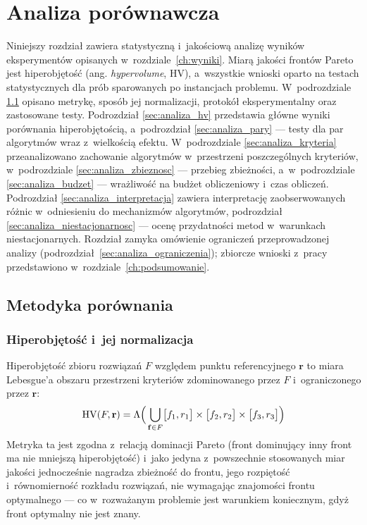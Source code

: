 \chapter{Analiza porównawcza}
\label{ch:analiza}

Niniejszy rozdział zawiera statystyczną i~jakościową analizę wyników eksperymentów
opisanych w~rozdziale~\ref{ch:wyniki}. Miarą jakości frontów Pareto jest
hiperobjętość (ang. \textit{hypervolume}, HV), a~wszystkie wnioski oparto na
testach statystycznych dla prób sparowanych po instancjach problemu.
W~podrozdziale \ref{sec:analiza_metodyka} opisano metrykę, sposób jej normalizacji,
protokół eksperymentalny oraz zastosowane testy. Podrozdział
\ref{sec:analiza_hv} przedstawia główne wyniki porównania hiperobjętością,
a~podrozdział \ref{sec:analiza_pary} --- testy dla par algorytmów wraz z~wielkością
efektu. W~podrozdziale \ref{sec:analiza_kryteria} przeanalizowano zachowanie
algorytmów w~przestrzeni poszczególnych kryteriów, w~podrozdziale
\ref{sec:analiza_zbieznosc} --- przebieg zbieżności, a~w~podrozdziale
\ref{sec:analiza_budzet} --- wrażliwość na budżet obliczeniowy i~czas obliczeń.
Podrozdział \ref{sec:analiza_interpretacja} zawiera interpretację zaobserwowanych
różnic w~odniesieniu do mechanizmów algorytmów, podrozdział
\ref{sec:analiza_niestacjonarnosc} --- ocenę przydatności metod w~warunkach
niestacjonarnych. Rozdział zamyka omówienie ograniczeń przeprowadzonej analizy
(podrozdział~\ref{sec:analiza_ograniczenia}); zbiorcze wnioski z~pracy
przedstawiono w~rozdziale~\ref{ch:podsumowanie}.

\section{Metodyka porównania}
\label{sec:analiza_metodyka}

\subsection{Hiperobjętość i~jej normalizacja}
\label{sec:analiza_hv_def}
Hiperobjętość zbioru rozwiązań $F$ względem punktu referencyjnego $\mathbf{r}$
to miara Lebesgue'a obszaru przestrzeni kryteriów zdominowanego przez $F$
i~ograniczonego przez $\mathbf{r}$:
\begin{equation}
    \label{eq:hv}
    \mathrm{HV}(F, \mathbf{r}) = \Lambda\Bigl(\,\bigcup_{\mathbf{f} \in F}
        \bigl[f_1, r_1\bigr] \times \bigl[f_2, r_2\bigr] \times \bigl[f_3, r_3\bigr]\Bigr)
\end{equation}
Metryka ta jest zgodna z~relacją dominacji Pareto (front dominujący inny front ma
nie mniejszą hiperobjętość) i~jako jedyna z~powszechnie stosowanych miar jakości
jednocześnie nagradza zbieżność do frontu, jego rozpiętość i~równomierność
rozkładu rozwiązań, nie wymagając znajomości frontu optymalnego --- co w~rozważanym
problemie jest warunkiem koniecznym, gdyż front optymalny nie jest znany.

